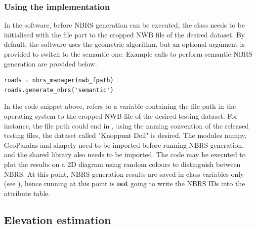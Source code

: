 \subsubsection{Using the implementation}

In the software, before NBRS generation can be executed, the  class needs to be initialised with the file part to the cropped NWB file of the desired dataset. By default, the software uses the geometric algorithm, but an optional argument is provided to switch to the semantic one. Example calls to perform semantic NBRS generation are provided below.

\begin{lstlisting}
roads = nbrs_manager(nwb_fpath)
roads.generate_nbrs('semantic')
\end{lstlisting}

In the code snippet above,  refers to a variable containing the file path in the operating system to the cropped NWB file of the desired testing dataset. For instance, the file path could end in , using the naming convention of the released testing files, the dataset called "Knoppunt Deil" is desired. The modules numpy, GeoPandas and shapely need to be imported before running NBRS generation, and the shared library  also needs to be imported. The code  may be executed to plot the results on a 2D diagram using random colours to distinguish between NBRS. At this point, NBRS generation results are saved in class variables only (see ), hence running  at this point is \textbf{not} going to write the NBRS IDs into the attribute table.

\subsection{Elevation estimation}
\label{sub:r_elevationestimation}


